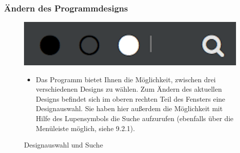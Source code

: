 \subsubsection{Ändern des Programmdesigns}
\begin{figure}[h!]
	\centering
	\includegraphics[width=.4\textwidth]{Design_Aendern.png}
	\caption{Designauswahl und Suche}
\begin{itemize}	
\item Das Programm bietet Ihnen die Möglichkeit, zwischen drei verschiedenen Designs zu wählen. Zum Ändern des aktuellen Designs befindet sich im oberen rechten Teil des Fensters eine Designauswahl. Sie haben hier außerdem die Möglichkeit mit Hilfe des Lupensymbols die Suche aufzurufen (ebenfalls über die Menüleiste möglich, siehe 9.2.1).
\end{itemize}
\end{figure}